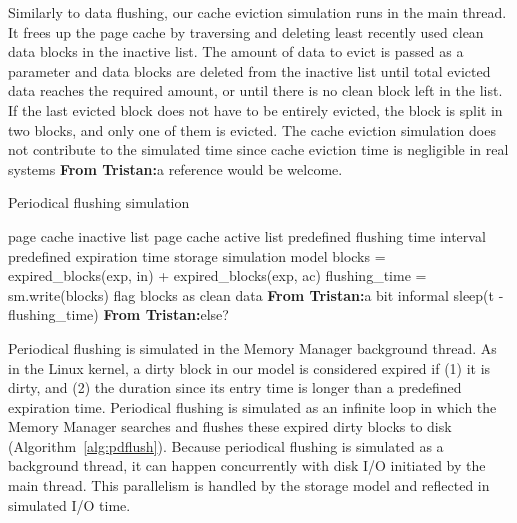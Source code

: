 \documentclass[conference]{IEEEtran}
\newcommand{\Desc}[2]{\State \makebox[2em][l]{#1}#2}
\newcommand{\tristan}[1]{\color{orange}\textbf{From Tristan:}#1\color{black}}
\begin{document}
    Similarly to data flushing, our cache eviction simulation runs in
    the main thread. It frees up the page cache by traversing and deleting 
    least recently used clean data blocks in the inactive list.
    The amount of data to evict is passed as a parameter and data blocks are deleted 
    from the inactive list until total evicted data reaches the required amount,
    or until there is no clean block left in the list.
    If the last evicted block does not have to be entirely evicted, the block is split in two blocks,
    and only one of them is evicted.
    The cache eviction simulation does not contribute to the simulated time 
    since cache eviction time is negligible in real systems \tristan{a reference would be welcome}.
    
    \begin{algorithm}\caption{Periodical flushing simulation}\label{alg:pdflush}
        \small
        \begin{algorithmic}[1]
            \Input
                \Desc{in}{page cache inactive list}
                \Desc{ac}{page cache active list}
                \Desc{t}{predefined flushing time interval}
                \Desc{exp}{predefined expiration time}
                \Desc{sm}{storage simulation model}
               \EndInput
                \State blocks = expired\_blocks(exp, in) + expired\_blocks(exp, ac) 
                \State flushing\_time = sm.write(blocks)
                \State flag blocks as clean data \tristan{a bit informal}
                    \State sleep(t - flushing\_time)
                \EndIf \tristan{else?}
            \EndWhile
        \end{algorithmic}
    \end{algorithm}

    Periodical flushing is simulated in the Memory Manager
    background thread. As in the Linux kernel, a dirty block
    in our model is considered expired if (1) it is dirty, and (2)
    the duration since its entry time is longer than a
    predefined expiration time. 
    Periodical flushing is simulated as an infinite loop in which 
    the Memory Manager searches and flushes these expired dirty blocks to disk (Algorithm~\ref{alg:pdflush}). 
    Because periodical flushing is simulated as a background thread, it can happen concurrently
    with disk I/O initiated by the main thread. This parallelism is handled by the 
    storage model and reflected in simulated I/O time.
\end{document}
